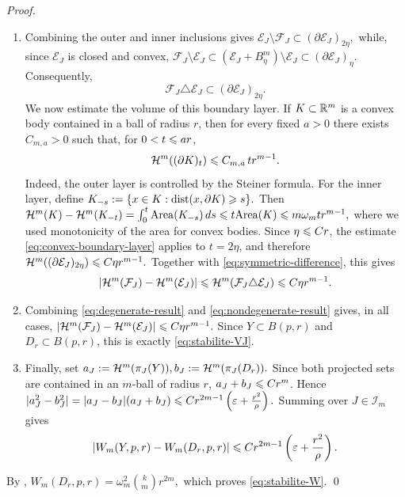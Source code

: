 \begin{proof}
\begin{enumerate}
\item Combining the outer and inner inclusions gives
\(\mathcal E_J\setminus\mathcal F_J \subset(\partial\mathcal E_J)_{2\eta},\)
while, since $\mathcal E_J$ is closed and convex,
\(\mathcal F_J\setminus\mathcal E_J \subset(\mathcal E_J+B^m_\eta)\setminus\mathcal E_J \subset(\partial\mathcal E_J)_\eta.\)
Consequently,
\begin{equation}
\label{eq:symmetric-difference}
 \mathcal F_J\triangle\mathcal E_J
 \subset(\partial\mathcal E_J)_{2\eta}.
\end{equation}
We now estimate the volume of this boundary layer. If
$K\subset\mathbb{R}^m$ is a convex body contained in a ball of radius $r$, then
for every fixed $a>0$ there exists $C_{m,a}>0$ such that, for
$0<t\leqslant ar$,
\begin{equation}
\label{eq:convex-boundary-layer}
 \mathcal{H}^m((\partial K)_t)\leqslant C_{m,a}\,t r^{m-1}.
\end{equation}
Indeed, the outer layer is controlled by the Steiner formula. For the
inner layer, define
\(K_{-s}:=\{x\in K:\operatorname{dist}(x,\partial K)\geqslant s\}.\)
Then
\(\mathcal{H}^m(K)-\mathcal{H}^m(K_{-t}) =\int_0^t \mathrm{Area}(K_{-s})\,ds \leqslant t \mathrm{Area}(K) \leqslant m\omega_m t r^{m-1},\)
where we used monotonicity of the area for convex bodies. Since
$\eta\leqslant Cr$, the estimate \eqref{eq:convex-boundary-layer} applies to
$t=2\eta$, and therefore
\(\mathcal{H}^m((\partial\mathcal E_J)_{2\eta}) \leqslant C\eta r^{m-1}.\)
Together with \eqref{eq:symmetric-difference}, this gives
\begin{equation}
\label{eq:nondegenerate-result}
 \left|\mathcal{H}^m(\mathcal F_J)-\mathcal{H}^m(\mathcal E_J)\right|
 \leqslant \mathcal{H}^m(\mathcal F_J\triangle\mathcal E_J) \leqslant C\eta r^{m-1}.
\end{equation}

\item Combining \eqref{eq:degenerate-result} and
\eqref{eq:nondegenerate-result} gives, in all cases,
\(\left|\mathcal{H}^m(\mathcal F_J)-\mathcal{H}^m(\mathcal E_J)\right| \leqslant C\eta r^{m-1}.\)
Since $Y\subset B(p,r)$ and $D_r\subset B(p,r)$, this is exactly
\eqref{eq:stabilite-VJ}.

\item Finally, set
\(a_J:=\mathcal{H}^m(\pi_J(Y)), b_J:=\mathcal{H}^m(\pi_J(D_r)).\)
Since both projected sets are contained in an $m$-ball of radius $r$,
$a_J+b_J\leqslant Cr^m$. Hence
\(|a_J^2-b_J^2| =|a_J-b_J|(a_J+b_J) \leqslant C r^{2m-1}\left(\varepsilon+\frac{r^2}{\rho}\right).\)
Summing over $J\in\mathcal I_m$ gives
\[
\left|W_m(Y,p,r)-W_m(D_r,p,r)\right| \leqslant C r^{2m-1}\left(\varepsilon+\frac{r^2}{\rho}\right).\]
\end{enumerate}
By ,
\(W_m(D_r,p,r)=\omega_m^2\binom{k}{m}r^{2m},\)
which proves \eqref{eq:stabilite-W}.
\qed
\end{proof}


